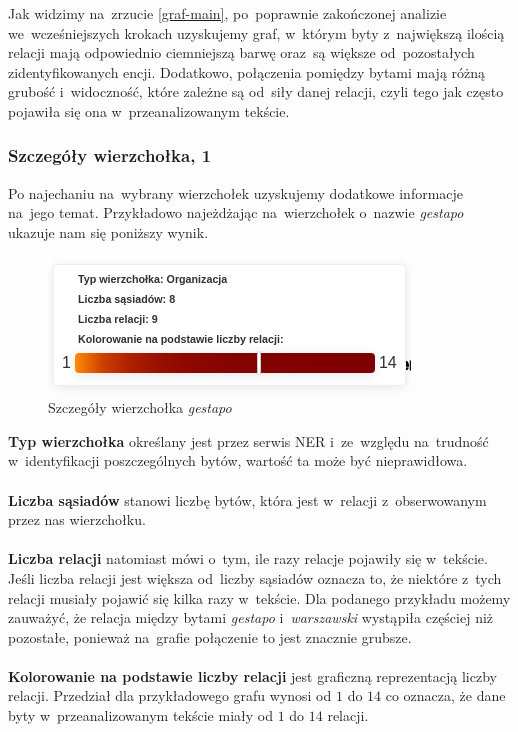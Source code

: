 \documentclass[12pt, a4paper]{article}
\begin{document}
Jak widzimy na~zrzucie \ref{graf-main}, po~poprawnie zakończonej analizie we~wcześniejszych krokach uzyskujemy graf, w~którym byty z~największą ilością relacji mają odpowiednio ciemniejszą barwę oraz~są większe od~pozostałych zidentyfikowanych encji. Dodatkowo, połączenia pomiędzy bytami mają różną grubość i~widoczność, które zależne są od~siły danej relacji, czyli tego jak często pojawiła się ona w~przeanalizowanym tekście.\\

\subsubsection{Szczegóły wierzchołka, 1}

Po najechaniu na~wybrany wierzchołek uzyskujemy dodatkowe informacje na~jego temat. Przykładowo najeżdżając na~wierzchołek o~nazwie \textit{gestapo} ukazuje nam się poniższy wynik.

\begin{figure}[H]
  \centering
  \includegraphics[width=0.6\linewidth]{images/graph-gestapo.png}
  \caption{Szczegóły wierzchołka \textit{gestapo}}
\end{figure}

\noindent\textbf{Typ wierzchołka} określany jest przez serwis NER i~ze~względu na~trudność w~identyfikacji poszczególnych bytów, wartość ta może być nieprawidłowa.\\\\
\textbf{Liczba sąsiadów} stanowi liczbę bytów, która jest w~relacji z~obserwowanym przez nas wierzchołku.\\\\
\textbf{Liczba relacji} natomiast mówi o~tym, ile razy relacje pojawiły się w~tekście. Jeśli liczba relacji jest większa od~liczby sąsiadów oznacza to, że niektóre z~tych relacji musiały pojawić się kilka razy w~tekście. Dla podanego przykładu możemy zauważyć, że relacja między bytami \textit{gestapo} i~\textit{warszawski} wystąpiła częściej niż pozostałe, ponieważ na~grafie połączenie to jest znacznie grubsze.\\\\
\textbf{Kolorowanie na podstawie liczby relacji} jest graficzną reprezentacją liczby relacji. Przedział dla przykładowego grafu wynosi od $1$ do $14$ co oznacza, że dane byty w~przeanalizowanym tekście miały od $1$ do $14$ relacji.
\end{document}
